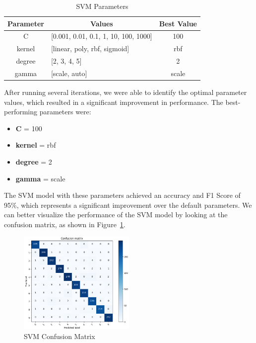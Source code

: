 \documentclass[conference]{IEEEtran}
\begin{document}
\begin{table}[!h]
    \centering
    \label{tab:svm_parameters}
    \begin{tabular}{|c|l|c|}
    \hline
    \textbf{Parameter} & \multicolumn{1}{c|}{\textbf{Values}}     & \multicolumn{1}{l|}{\textbf{Best Value}} \\ \hline
    C                  & {[}0.001, 0.01, 0.1, 1, 10, 100, 1000{]} & 100                                      \\ \hline
    kernel             & {[}linear, poly, rbf, sigmoid{]}         & rbf                                      \\ \hline
    degree             & {[}2, 3, 4, 5{]}                         & 2                                        \\ \hline
    gamma              & {[}scale, auto{]}                        & scale                                    \\ \hline
    \end{tabular}
    \caption{SVM Parameters}
\end{table}

After running several iterations, we were able to identify the optimal parameter values, which resulted in a significant improvement in performance. The best-performing parameters were: 

\begin{itemize}
    \item \textbf{C} = 100
    \item \textbf{kernel} = rbf
    \item \textbf{degree} = 2
    \item \textbf{gamma} = scale
\end{itemize}
The SVM model with these parameters achieved an accuracy and F1 Score of 95\%, which represents a significant improvement over the default parameters.
We can better visualize the performance of the SVM model by looking at the confusion matrix, as shown in Figure~\ref{fig:svm_confusion_matrix}.

\begin{figure}[!h]
    \centering
    \includegraphics[width=0.5\textwidth]{assets/svm-confusion-matrix.png}
    \caption{SVM Confusion Matrix}
    \label{fig:svm_confusion_matrix}
\end{figure}
\end{document}
